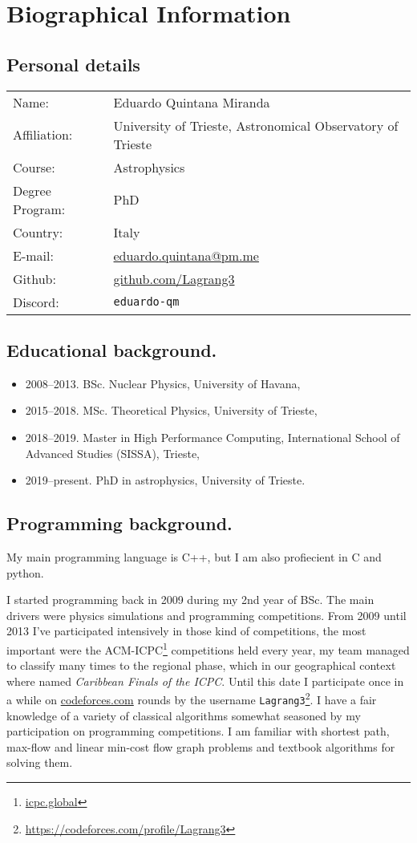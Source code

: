 \section{Biographical Information}

\subsection*{Personal details}

\begin{tabular}{ll} 
    Name:& Eduardo Quintana Miranda\\ 
    Affiliation:& University of Trieste, Astronomical Observatory of Trieste\\
    Course:& Astrophysics \\
    Degree Program:& PhD \\ 
    Country:& Italy\\
    E-mail:& \url{eduardo.quintana@pm.me} \\ 
    Github:& \url{github.com/Lagrang3} \\
    Discord:& \texttt{eduardo-qm}
\end{tabular}

\subsection*{Educational background.}

\begin{itemize} 
    \item 2008--2013. BSc. Nuclear Physics, University of Havana,
    \item 2015--2018. MSc. Theoretical Physics, University of Trieste, 
    \item
    2018--2019. Master in High Performance Computing, International School of
    Advanced Studies (SISSA), Trieste, 
    \item 2019--present. PhD in astrophysics,
    University of Trieste.  
\end{itemize}

\subsection*{Programming background.} 
My main programming language is C++, but I am also profiecient in C and python.

I started programming back in 2009 during my 2nd year of BSc.  The main drivers
were physics simulations and programming competitions.  From 2009 until 2013
I've participated intensively in those kind of competitions, 
the most important were the
ACM-ICPC\footnote{\url{icpc.global}} competitions held every year, my team
managed to classify many times to the regional phase, which in our geographical
context where named \emph{Caribbean Finals of the ICPC}.  Until this date I
participate once in a while on \url{codeforces.com} rounds by the username
\texttt{Lagrang3}\footnote{\url{https://codeforces.com/profile/Lagrang3}}.
I have a fair knowledge of a variety of classical algorithms somewhat seasoned
by my participation on programming competitions. I am familiar with shortest
path, max-flow and linear min-cost flow graph problems and textbook algorithms
for solving them.

